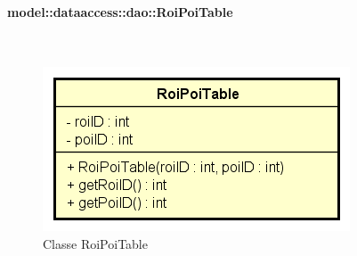 \documentclass[../DefinizioneDiProdotto.tex]{subfiles}
\begin{document}
\paragraph{model::dataaccess::dao::RoiPoiTable}
\
\begin{figure}[H]
	\centering
	\includegraphics[width=\maxwidth]{img/RoiPoiTable.png}
	\caption{Classe RoiPoiTable}\label{fig:model::dataaccess::dao::RoiPoiTable} 
\end{figure}
\end{document}
